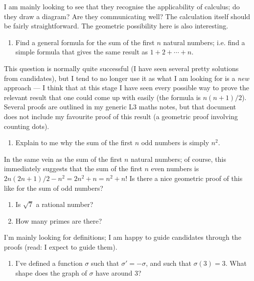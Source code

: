 \documentclass{amsart}
\begin{document}
I am mainly looking to see that they recognise the applicability of calculus; do they draw a diagram? Are they communicating
well? The calculation itself should be fairly straightforward. The geometric possibility here is also interesting.

\filbreak\begin{enumerate}[resume]\bfseries
  \item Find a general formula for the sum of the first $ n $ natural numbers; i.e. find a simple formula that
        gives the same result as $ 1 + 2 + \cdots + n $.
\end{enumerate}

This question is normally quite successful (I have seen several pretty solutions from candidates), but I tend to no
longer use it as what I am looking for is a \emph{new} approach --- I think that at this stage I have seen every possible
way to prove the relevant result that one could come up with easily (the formula is $ n(n+1)/2 $). Several proofs
are outlined in my generic L3 maths notes, but that document does not include my favourite proof of this result (a geometric
proof involving counting dots).

\filbreak\begin{enumerate}[resume]\bfseries
  \item Explain to me why the sum of the first $ n $ odd numbers is simply $ n^2 $.
\end{enumerate}

In the same vein as the sum of the first $ n $ natural numbers; of course, this immediately suggests that the sum
of the first $ n $ even numbers is $ 2n(2n+1)/2 - n^2 = 2n^2 + n = n^2 + n $! Is there a nice geometric proof of this
like for the sum of odd numbers?

\filbreak\begin{enumerate}[resume]\bfseries
  \item Is $ \sqrt{7} $ a rational number?
  \item How many primes are there?
\end{enumerate}
I'm mainly looking for definitions; I am happy to guide candidates through the proofs (read: I expect to guide them).

\filbreak\begin{enumerate}[resume]\bfseries
  \item I've defined a function $ \sigma $ such that $ \sigma' = -\sigma $, and such that $ \sigma(3) = 3 $. What shape does the graph
        of $ \sigma $ have around 3?
\end{enumerate}
\end{document}
